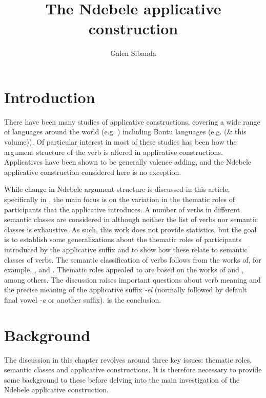 \documentclass[output=paper]{langsci/langscibook}
\title{The Ndebele applicative construction}
\author{%
 Galen Sibanda \affiliation{Michigan State University} 
}
\begin{document}
\section{Introduction}\label{sec:sibanda:1}

There have been many studies of applicative constructions, covering a wide range of languages around the world (e.g. \citealt{Peterson2007}) including Bantu languages (e.g. \citealt{Ngonyani1996,Mabugu2011,Jerro2016} (\& this volume)). Of particular interest in most of these studies has been how the argument structure of the verb is altered in applicative constructions. Applicatives have been shown to be generally valence adding, and the Ndebele applicative construction considered here is no exception. 

 While change in Ndebele argument structure is discussed in this article, specifically in , the main focus is on the variation in the thematic roles of participants that the applicative introduces. A number of verbs in different semantic classes are considered in  although neither the list of verbs nor semantic classes is exhaustive. As such, this work does not provide statistics, but the goal is to establish some generalizations about the thematic roles of participants introduced by the applicative suffix and to show how these relate to semantic classes of verbs. The semantic classification of verbs follows from the works of, for example, \citet{Chafe1970,Dowty1987,Dowty1991,FoleyVanValin1984}, and \citet{Payne1997}. Thematic roles appealed to are based on the works of \citet{Frawley1992,Fillmore1968,Fillmore1977} and \citet{Halliday1970}, among others. The discussion raises important questions about verb meaning and the precise meaning of the applicative suffix \textit{-el} (normally followed by default final vowel \textit{-a} or another suffix).  is the conclusion.

\section{Background}\label{sec:sibanda:2}

The discussion in this chapter revolves around three key issues: thematic roles, semantic classes and applicative constructions. It is therefore necessary to provide some background to these before delving into the main investigation of the Ndebele applicative construction. 
\end{document}
